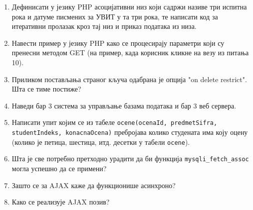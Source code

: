 \documentclass[a4paper]{article}
\begin{document}
\begin{enumerate}
\hrulefill

\hrulefill

\hrulefill

\item Дефинисати у језику PHP асоцијативни низ који садржи називе три испитна рока и
датуме писмених за УВИТ у та три рока, те написати код за
итеративни пролазак кроз тај низ и приказ података из низа.

\hrulefill

\hrulefill

\hrulefill

\hrulefill


\item Навести пример у језику PHP како се процесирају параметри који су пренесни методом GET (на пример, када корисник кликне на везу из питања 10). \hrulefill

\hrulefill

\hrulefill

\item Приликом постављања страног кључа одабрана је опција "on delete restrict". Шта се тиме постиже? \hrulefill

\hrulefill

\hrulefill



\item Наведи бар 3 система за управљање базама података и бар 3 веб сервера. \hrulefill

\hrulefill


\item Написати упит којим се из табеле \verb|ocene(ocenaId, predmetSifra, studentIndeks, konacnaOcena)| 
пребројава колико студената има коју оцену (колико је петица, шестица, итд. десетки у табели \verb|ocene|).

\hrulefill

\hrulefill

\hrulefill

\item Шта је све потребно претходно урадити да би функција \verb|mysqli_fetch_assoc| могла успешно да се примени?\hrulefill

\hrulefill

\hrulefill


\item Зашто се за AJAX каже да функционише асинхроно? \hrulefill 

\hrulefill

\hrulefill

\item Како се реализује AJAX позив? \hrulefill

\hrulefill

\hrulefill

\end{enumerate}
\end{document}
